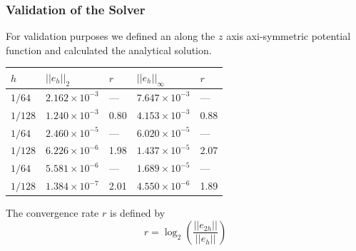 \documentclass[xcolor=pdftex,table,10pt]{beamer}
\begin{document}
     	\begin{frame}
		\frametitle{Validation of the Solver}

		For validation purposes we defined an along the $z$ axis axi-symmetric potential function and calculated the analytical solution. 

    	\begin{center}
        \begin{tabular}{lllll}
              \hline
              $h$ & $\vert\vert e_h \vert\vert_2$ & $r$ & $\vert\vert e_h
              \vert\vert_\infty$ & $r$ \\ [0.2ex] \hline \hline
              $1/64$  & $2.162 \times 10^{-3}$ & --- & $7.647 \times 10^{-3}$ & --- \\ 
              $1/128$ & $1.240 \times 10^{-3}$ & 0.80 & $4.153 \times 10^{-3}$ & 0.88 \\ 
              \hline
              \hline
              $1/64$  & $2.460 \times 10^{-5}$ & --- & $6.020 \times 10^{-5}$ & --- \\
              $1/128$ & $6.226 \times 10^{-6}$ & 1.98 & $1.437 \times 10^{-5}$ & 2.07 \\
              \hline
              \hline
              $1/64$  & $5.581 \times 10^{-6}$ & --- & $1.689 \times 10^{-5}$ & --- \\ 
              $1/128$ & $1.384 \times 10^{-7}$ & 2.01 & $4.550 \times 10^{-6}$ & 1.89  \\ 
            \hline
        \end{tabular}
        \end{center}

        \vspace{0.4cm}


       

        The convergence rate $r$ is defined by
        \[
            r = \log_2 \left( \frac{\vert\vert e_{2h} \vert\vert}{\vert\vert e_h \vert\vert} \right)
        \]

	\end{frame}
    
\end{document}
